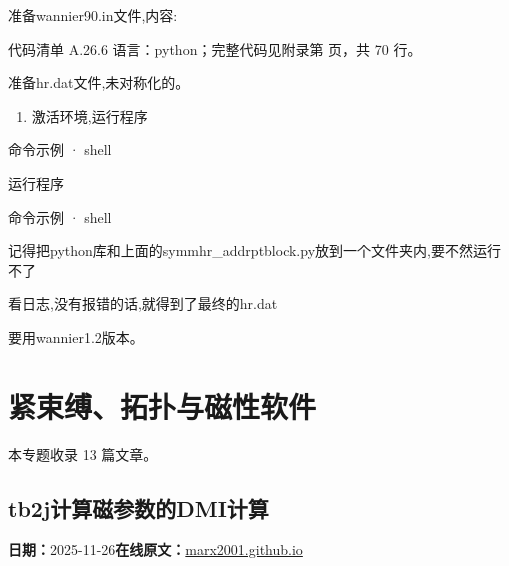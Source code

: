 \documentclass[lang=cn,scheme=chinese,color=blue,device=normal,toc=onecol,math=cm]{elegantbook}
\begin{document}
准备wannier90.in文件,内容:\par


\begin{codeindexbox}{代码清单 A.26.6}
语言：python；完整代码见附录第 \pageref{code:26:6} 页，共 70 行。
\end{codeindexbox}


准备hr.dat文件,未对称化的。\par


\begin{enumerate}
\item 激活环境,运行程序
\end{enumerate}


\begin{inlinecodebox}{命令示例 · shell}
\end{inlinecodebox}


运行程序\par


\begin{inlinecodebox}{命令示例 · shell}
\end{inlinecodebox}


记得把python库和上面的symmhr\_\allowbreak{}addrptblock.py放到一个文件夹内,要不然运行不了\par


看日志,没有报错的话,就得到了最终的hr.dat\par


要用wannier1.2版本。\par


\chapter{紧束缚、拓扑与磁性软件}
\begin{partbox}本专题收录 13 篇文章。\end{partbox}

\section{tb2j计算磁参数的DMI计算}
\begin{articlemeta}
\textbf{日期：}2025-11-26\hfill\textbf{在线原文：}\href{https://marx2001.github.io/sci-note\_posts/20251126-DMI-tb2j}{marx2001.github.io}
\end{articlemeta}
\end{document}
